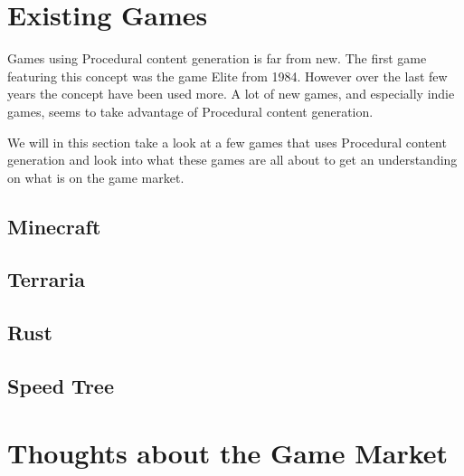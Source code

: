 \section{Existing Games}

Games using Procedural content generation is far from new. The first game featuring this concept was the game Elite from 1984. However over the last few years the concept have been used more. A lot of new games, and especially indie games, seems to take advantage of Procedural content generation.

We will in this section take a look at a few games that uses Procedural content generation and look into what these games are all about to get an understanding on what is on the game market.

\subsection{Minecraft}

\subsection{Terraria}

\subsection{Rust}

\subsection{Speed Tree}

\section{Thoughts about the Game Market}